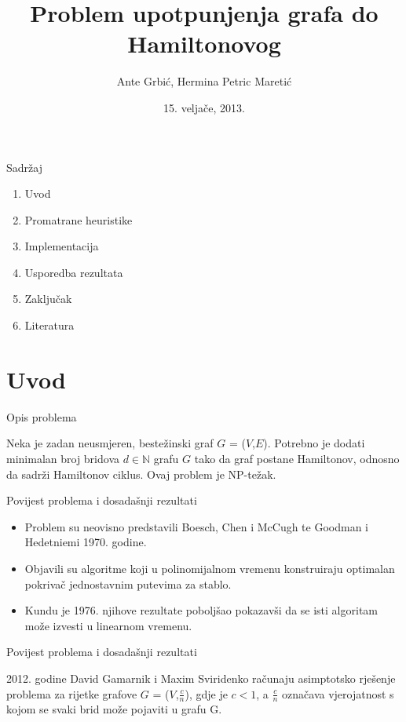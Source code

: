 \documentclass{beamer}
\title[Problem upotpunjenja grafa do Hamiltonovog]{Problem upotpunjenja grafa do Hamiltonovog}
\author{Ante Grbi\'{c}, Hermina Petric Mareti\'{c}}
\institute{Prirodoslovno-matemati\v{c}ki fakultet - Matemati\v{c}ki odjel \\ Seminar za teorijsko ra\v{c}unarstvo}
\date{15. velja\v{c}e, 2013.}
\begin{document}
\begin{frame}
\titlepage
\end{frame}

\begin{frame}{Sadr\v{z}aj}
\begin{enumerate}
\item Uvod
\item Promatrane heuristike
\item Implementacija
\item Usporedba rezultata
\item Zaklju\v{c}ak
\item Literatura
\end{enumerate}
\end{frame}

\section{Uvod}

\begin{frame}{Opis problema}

Neka je zadan neusmjeren, beste\v{z}inski graf $G$ = ($V$,$E$). Potrebno je dodati minimalan broj bridova $d \in \mathbb N$ grafu $G$ tako da graf postane Hamiltonov, odnosno da sadrži Hamiltonov ciklus.
Ovaj problem je NP-te\v{z}ak.

\end{frame}


\begin{frame}{Povijest problema i dosada\v{s}nji rezultati}

\begin{itemize}
\item Problem su neovisno predstavili Boesch, Chen i McCugh te Goodman i Hedetniemi 1970. godine. 
\item Objavili su algoritme koji u polinomijalnom vremenu konstruiraju optimalan pokriva\v{c} jednostavnim putevima za stablo.
\item Kundu je 1976. njihove rezultate pobolj\v{s}ao pokazav\v{s}i da se isti algoritam mo\v{z}e izvesti u linearnom vremenu.
\end{itemize}

\end{frame}

\begin{frame}{Povijest problema i dosada\v{s}nji rezultati}

2012. godine David Gamarnik i Maxim Sviridenko ra\v{c}unaju asimptotsko rje\v{s}enje problema za rijetke grafove $G$ = ($V$,$\frac{c} {n}$),  gdje je $c < 1$, a $\frac{c} {n}$ ozna\v{c}ava vjerojatnost s kojom se svaki brid mo\v{z}e pojaviti u grafu G. 
\end{frame}
\end{document}
